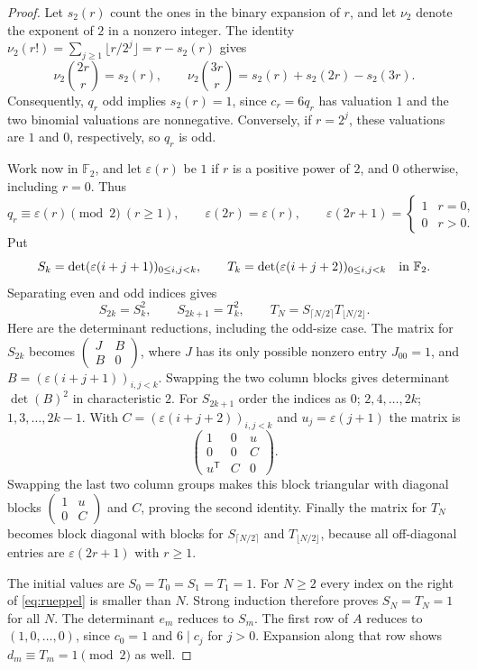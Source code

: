 \documentclass[11pt]{article}
\newcommand{\FF}{\mathbb F_2}
\newcommand{\ep}{\varepsilon}
\begin{document}
\begin{proof}
Let $s_2(r)$ count the ones in the binary expansion of $r$, and let
$\nu_2$ denote the exponent of $2$ in a nonzero integer.
The identity
$\nu_2(r!)=\sum_{j\geq1}\lfloor r/2^j\rfloor=r-s_2(r)$ gives
\[
 \nu_2\binom{2r}r=s_2(r),\qquad
 \nu_2\binom{3r}r=s_2(r)+s_2(2r)-s_2(3r).
\]
Consequently, $q_r$ odd implies $s_2(r)=1$, since $c_r=6q_r$ has
valuation $1$ and the two binomial valuations are nonnegative. Conversely,
if $r=2^j$, these valuations are $1$ and $0$, respectively, so $q_r$ is odd.

Work now in $\FF$, and let $\ep(r)$ be $1$ if $r$ is a positive power of
$2$, and $0$ otherwise, including $r=0$. Thus
\[
 q_r\equiv\ep(r)\pmod2\ (r\geq1),\qquad
 \ep(2r)=\ep(r),\qquad
 \ep(2r+1)=\begin{cases}1&r=0,\\0&r>0.\end{cases}
\]
Put
\[
 S_k=\det(\ep(i+j+1))_{0\leq i,j<k},\qquad
 T_k=\det(\ep(i+j+2))_{0\leq i,j<k}
 \quad\hbox{in }\FF.
\]
Separating even and odd indices gives
\begin{equation}\label{eq:rueppel}
 S_{2k}=S_k^2,\qquad S_{2k+1}=T_k^2,\qquad
 T_N=S_{\lceil N/2\rceil}T_{\lfloor N/2\rfloor}.
\end{equation}
Here are the determinant reductions, including the odd-size case.
The matrix for $S_{2k}$ becomes
$\left(\begin{smallmatrix}J&B\\B&0\end{smallmatrix}\right)$,
where $J$ has its only possible nonzero entry $J_{00}=1$, and
$B=(\ep(i+j+1))_{i,j<k}$. Swapping the two column blocks gives
determinant $\det(B)^2$ in characteristic $2$.
For $S_{2k+1}$ order the indices as $0$; $2,4,\ldots,2k$;
$1,3,\ldots,2k-1$. With
$C=(\ep(i+j+2))_{i,j<k}$ and $u_j=\ep(j+1)$ the matrix is
\[
 \begin{pmatrix}1&0&u\\0&0&C\\u^{\mathsf T}&C&0\end{pmatrix}.
\]
Swapping the last two column groups makes this block triangular with
diagonal blocks $\left(\begin{smallmatrix}1&u\\0&C\end{smallmatrix}\right)$
and $C$, proving the second identity.
Finally the matrix for $T_N$ becomes block diagonal with blocks for
$S_{\lceil N/2\rceil}$ and $T_{\lfloor N/2\rfloor}$, because all
off-diagonal entries are $\ep(2r+1)$ with $r\geq1$.

The initial values are $S_0=T_0=S_1=T_1=1$.
For $N\geq2$ every index on the right of \eqref{eq:rueppel} is smaller
than $N$. Strong induction therefore proves $S_N=T_N=1$ for all $N$.
The determinant $e_m$ reduces to $S_m$. The first row of $A$ reduces
to $(1,0,\ldots,0)$, since $c_0=1$ and $6\mid c_j$ for $j>0$.
Expansion along that row shows $d_m\equiv T_m=1\pmod2$ as well.
\end{proof}
\end{document}
